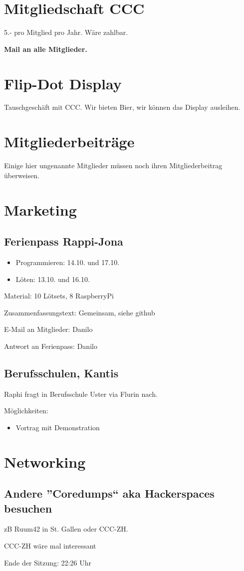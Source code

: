 \documentclass[10pt,a4paper,parskip,fleqn]{scrartcl}
\newcommand{\ul}{\begin{itemize}[itemsep=-0.3em,topsep=-0.3em]}
\newcommand{\lu}{\end{itemize}}
\newcommand{\li}{\item}
\begin{document}
\section{Mitgliedschaft CCC}

5.- pro Mitglied pro Jahr. Wäre zahlbar.

\textbf{Mail an alle Mitglieder.}

\section{Flip-Dot Display}

Tauschgeschäft mit CCC. Wir bieten Bier, wir können das Display ausleihen.


\section{Mitgliederbeiträge}

Einige hier ungenannte Mitglieder müssen noch ihren Mitgliederbeitrag
überweisen.


\section{Marketing}


\subsection{Ferienpass Rappi-Jona}

\ul
\li	Programmieren: 14.10. und 17.10.
\li Löten:	13.10. und 16.10.
\lu

Material: 10 Lötsets, 8 RaspberryPi

Zusammenfassungstext: Gemeinsam, siehe github

E-Mail an Mitglieder: Danilo

Antwort an Ferienpass: Danilo

\subsection{Berufsschulen, Kantis}

Raphi fragt in Berufsschule Uster via Flurin nach.

Möglichkeiten:
\ul
\li Vortrag mit Demonstration
\lu


\section{Networking}

\subsection{Andere ''Coredumps`` aka Hackerspaces besuchen}

zB Ruum42 in St. Gallen oder CCC-ZH.

CCC-ZH wäre mal interessant

\vspace{1cm}

Ende der Sitzung: 22:26 Uhr
\end{document}
